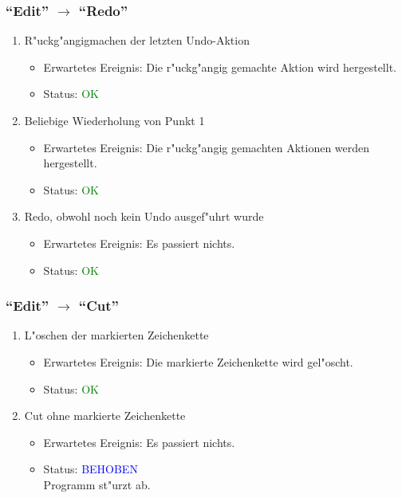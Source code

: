 \subsubsection{"`Edit"' $\rightarrow$ "`Redo"'}
\begin{enumerate}
\item R"uckg"angigmachen der letzten Undo-Aktion
\begin{itemize}
\item Erwartetes Ereignis: Die r"uckg"angig gemachte Aktion wird hergestellt. 
\item Status: \textcolor{green}{OK}
\end{itemize}
\item Beliebige Wiederholung von Punkt 1
\begin{itemize}
\item Erwartetes Ereignis: Die r"uckg"angig gemachten Aktionen werden hergestellt. 
\item Status: \textcolor{green}{OK}
\end{itemize}
\item Redo, obwohl noch kein Undo ausgef"uhrt wurde
\begin{itemize}
\item Erwartetes Ereignis: Es passiert nichts. 
\item Status: \textcolor{green}{OK}
\end{itemize}
\end{enumerate}
\subsubsection{"`Edit"' $\rightarrow$ "`Cut"'}
\begin{enumerate}
\item L"oschen der markierten Zeichenkette
\begin{itemize}
\item Erwartetes Ereignis: Die markierte Zeichenkette wird gel"oscht. 
\item Status: \textcolor{green}{OK}
\end{itemize}
\item Cut ohne markierte Zeichenkette
\begin{itemize}
\item Erwartetes Ereignis: Es passiert nichts. 
\item Status: \textcolor{blue}{BEHOBEN} \\
Programm st"urzt ab.
\end{itemize}
\end{enumerate}
